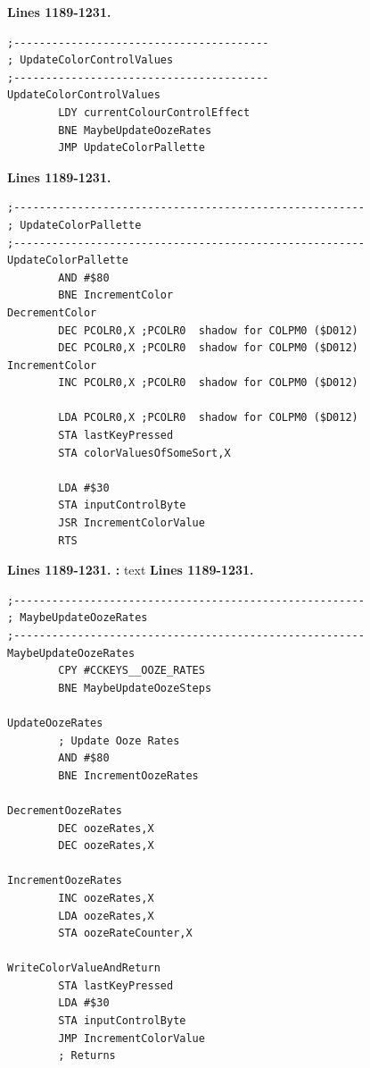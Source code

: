 \textbf{Lines 1189-1231. } 
\begin{lstlisting}
;----------------------------------------
; UpdateColorControlValues
;----------------------------------------
UpdateColorControlValues
        LDY currentColourControlEffect
        BNE MaybeUpdateOozeRates
        JMP UpdateColorPallette

\end{lstlisting}
\textbf{Lines 1189-1231. } 
\begin{lstlisting}
;-------------------------------------------------------
; UpdateColorPallette
;-------------------------------------------------------
UpdateColorPallette
        AND #$80
        BNE IncrementColor
DecrementColor   
        DEC PCOLR0,X ;PCOLR0  shadow for COLPM0 ($D012)
        DEC PCOLR0,X ;PCOLR0  shadow for COLPM0 ($D012)
IncrementColor   
        INC PCOLR0,X ;PCOLR0  shadow for COLPM0 ($D012)

        LDA PCOLR0,X ;PCOLR0  shadow for COLPM0 ($D012)
        STA lastKeyPressed
        STA colorValuesOfSomeSort,X

        LDA #$30
        STA inputControlByte
        JSR IncrementColorValue
        RTS 

\end{lstlisting}

\clearpage

\textbf{Lines 1189-1231. :} 
text
\clearpage
\textbf{Lines 1189-1231. } 
\begin{lstlisting}
;-------------------------------------------------------
; MaybeUpdateOozeRates   
;-------------------------------------------------------
MaybeUpdateOozeRates   
        CPY #CCKEYS__OOZE_RATES
        BNE MaybeUpdateOozeSteps

UpdateOozeRates   
        ; Update Ooze Rates
        AND #$80
        BNE IncrementOozeRates

DecrementOozeRates   
        DEC oozeRates,X
        DEC oozeRates,X

IncrementOozeRates   
        INC oozeRates,X
        LDA oozeRates,X
        STA oozeRateCounter,X

WriteColorValueAndReturn
        STA lastKeyPressed
        LDA #$30
        STA inputControlByte
        JMP IncrementColorValue
        ; Returns

\end{lstlisting}


